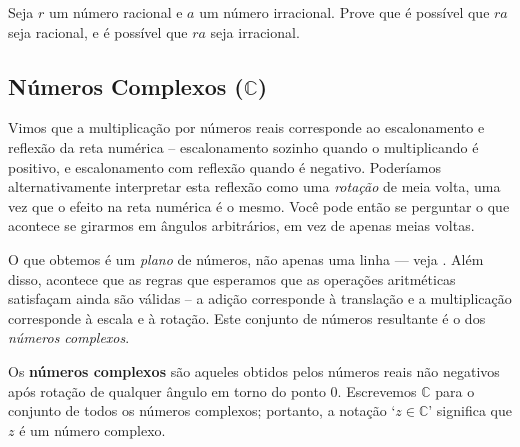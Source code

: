 \begin{exercise}
Seja $r$ um número racional e $a$ um número irracional. Prove que é possível que $ra$ seja racional, e é possível que $ra$ seja irracional.\end{exercise}


\subsection*{Números Complexos ($\mathbb{C}$)}

Vimos que a multiplicação por números reais corresponde ao escalonamento e reflexão da reta numérica – escalonamento sozinho quando o multiplicando é positivo, e escalonamento com reflexão quando é negativo. Poderíamos alternativamente interpretar esta reflexão como uma \textit{rotação} de meia volta, uma vez que o efeito na reta numérica é o mesmo. Você pode então se perguntar o que acontece se girarmos em ângulos arbitrários, em vez de apenas meias voltas.

O que obtemos é um \textit{plano} de números, não apenas uma linha --- veja . Além disso, acontece que as regras que esperamos que as operações aritméticas satisfaçam ainda são válidas – a adição corresponde à translação e a multiplicação corresponde à escala e à rotação. Este conjunto de números resultante é o dos \textit{números complexos}.

\begin{definition}
\label{defComplexNumbersInformal}
Os \textbf{números complexos} são aqueles obtidos pelos números reais não negativos após rotação de qualquer ângulo em torno do ponto $0$. Escrevemos $\mathbb{C}$  para o conjunto de todos os números complexos; portanto, a notação `$z \in \mathbb{C}$' significa que $z$ é um número complexo.
\end{definition}

